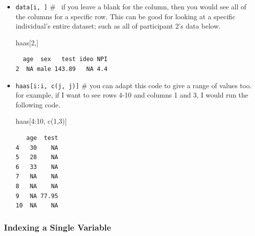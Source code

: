 \documentclass[
  letterpaper,
  DIV=11,
  numbers=noendperiod,
  oneside]{scrreprt}
\newenvironment{Shaded}{\begin{snugshade}}{\end{snugshade}}
\newcommand{\DecValTok}[1]{\textcolor[rgb]{0.68,0.00,0.00}{#1}}
\newcommand{\FunctionTok}[1]{\textcolor[rgb]{0.28,0.35,0.67}{#1}}
\newcommand{\NormalTok}[1]{\textcolor[rgb]{0.00,0.23,0.31}{#1}}
\newcommand{\SpecialCharTok}[1]{\textcolor[rgb]{0.37,0.37,0.37}{#1}}
\begin{document}
\begin{itemize}
\item
  \texttt{data{[}i,\ {]}} \# ~if you leave a blank for the column, then
  you would see all of the columns for a specific row. This can be good
  for looking at a specific individual's entire dataset; such as all of
  participant 2's data below.

\begin{Shaded}
\begin{Highlighting}[]
\NormalTok{haas[}\DecValTok{2}\NormalTok{,]}
\end{Highlighting}
\end{Shaded}

\begin{verbatim}
  age  sex   test ideo NPI
2  NA male 143.89   NA 4.4
\end{verbatim}
\item
  \texttt{haas{[}i:i,\ c(j,\ j){]}} \# you can adapt this code to give a
  range of values too. for example, if I want to see rows 4-10 and
  columns 1 and 3, I would run the following code.

\begin{Shaded}
\begin{Highlighting}[]
\NormalTok{haas[}\DecValTok{4}\SpecialCharTok{:}\DecValTok{10}\NormalTok{, }\FunctionTok{c}\NormalTok{(}\DecValTok{1}\NormalTok{,}\DecValTok{3}\NormalTok{)]}
\end{Highlighting}
\end{Shaded}

\begin{verbatim}
   age  test
4   30    NA
5   28    NA
6   33    NA
7   NA    NA
8   NA    NA
9   NA 77.95
10  NA    NA
\end{verbatim}
\end{itemize}

\subsubsection{Indexing a Single
Variable}\label{indexing-a-single-variable}
\end{document}
